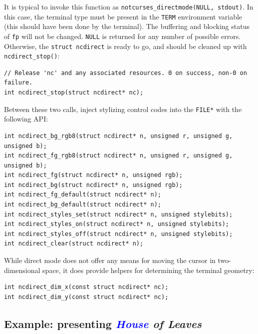 \documentclass[letterpaper,10pt]{article}
\begin{document}
It is typical to invoke this function as \texttt{notcurses\_directmode(NULL, stdout)}.
In this case, the terminal type must be present in the \texttt{TERM} environment
variable (this should have been done by the terminal). The buffering and
blocking status of \texttt{fp} will not be changed. \texttt{NULL} is returned for any number
of possible errors. Otherwise, the \texttt{struct ncdirect} is ready to go, and should
be cleaned up with \texttt{ncdirect\_stop()}:

\begin{listing}[!htbp]
\begin{verbatim}
// Release 'nc' and any associated resources. 0 on success, non-0 on failure.
int ncdirect_stop(struct ncdirect* nc);
\end{verbatim}
\end{listing}

Between these two calls, inject stylizing control codes into the \texttt{FILE*} with
the following API:

\begin{listing}[!htbp]
\begin{verbatim}
int ncdirect_bg_rgb8(struct ncdirect* n, unsigned r, unsigned g, unsigned b);
int ncdirect_fg_rgb8(struct ncdirect* n, unsigned r, unsigned g, unsigned b);
int ncdirect_fg(struct ncdirect* n, unsigned rgb);
int ncdirect_bg(struct ncdirect* n, unsigned rgb);
int ncdirect_fg_default(struct ncdirect* n);
int ncdirect_bg_default(struct ncdirect* n);
int ncdirect_styles_set(struct ncdirect* n, unsigned stylebits);
int ncdirect_styles_on(struct ncdirect* n, unsigned stylebits);
int ncdirect_styles_off(struct ncdirect* n, unsigned stylebits);
int ncdirect_clear(struct ncdirect* n);
\end{verbatim}
\end{listing}

While direct mode does not offer any means for moving the cursor in
two-dimensional space, it does provide helpers for determining the terminal
geometry:

\begin{listing}[!htbp]
\begin{verbatim}
int ncdirect_dim_x(const struct ncdirect* nc);
int ncdirect_dim_y(const struct ncdirect* nc);
\end{verbatim}
\end{listing}

\subsection{Example: presenting \textit{\textcolor{blue}{House} of Leaves}}
\end{document}
